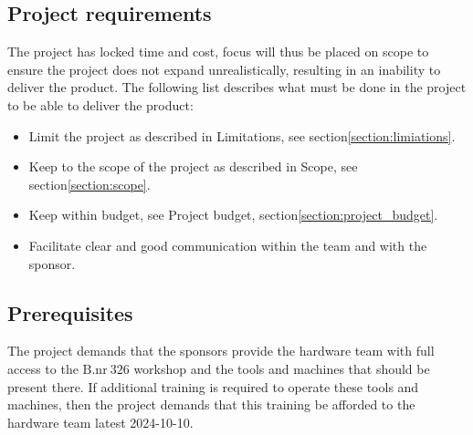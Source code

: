 \subsection{Project requirements}

The project has locked time and cost, focus will thus be placed on scope to ensure the project does not expand unrealistically, resulting in an inability to deliver the product. The following list describes what must be done in the project to be able to deliver the product:
\begin{itemize}
    \item Limit the project as described in Limitations, see section\:\ref{section:limiations}.
    \item Keep to the scope of the project as described in Scope, see section\:\ref{section:scope}. 
    \item Keep within budget, see Project budget, section\:\ref{section:project_budget}.
    \item Facilitate clear and good communication within the team and with the sponsor.
\end{itemize}



\subsection{Prerequisites}

The project demands that the sponsors provide the hardware team with full access to the $\text{B.nr}\:326$ workshop and the tools and machines that should be present there. If additional training is required to operate these tools and machines, then the project demands that this training be afforded to the hardware team latest 2024-10-10.



